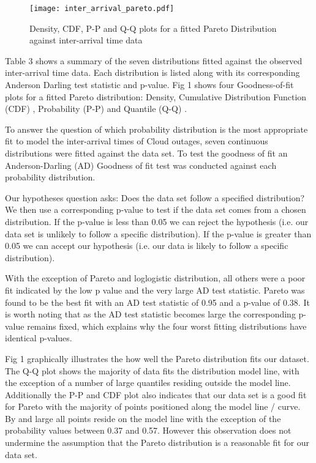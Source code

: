 \documentclass[5p]{elsarticle}
\begin{document}
\begin{figure*}[]
\begin{center}
\texttt{[image: inter\_arrival\_pareto.pdf]} 
\caption{Density, CDF, P-P and Q-Q plots for a fitted Pareto Distribution against inter-arrival time data}
\end{center}
\label{fig:outagedistribution}
\end{figure*}

Table 3 shows a summary of the seven distributions fitted against the observed inter-arrival time data. Each distribution is listed along with its corresponding Anderson Darling test statistic and p-value. Fig 1 shows four Goodness-of-fit plots for a fitted Pareto distribution: Density, Cumulative Distribution Function (CDF) , Probability (P-P) \cite{gibbons2011nonparametric}  and Quantile (Q-Q) \cite{wilk1968probability}.  


To answer the question of which probability distribution is the most appropriate fit to model the inter-arrival times of Cloud outages, seven continuous distributions were fitted against the data set. To test the goodness of fit an Anderson-Darling (AD) Goodness of fit test was conducted against each probability distribution. 

Our hypotheses question asks: Does the data set follow a specified distribution? We then use a corresponding p-value to test if the data set comes from a chosen distribution. If the p-value is less than 0.05 we can reject the hypothesis (i.e. our data set is unlikely to follow a specific distribution). If the p-value is greater than 0.05 we can accept our hypothesis (i.e. our data is likely to follow a specific distribution). 


With the exception of Pareto and loglogistic distribution, all others were a poor fit indicated by the low p value and the very large AD test statistic. Pareto was found to be the best fit with an AD test statistic of 0.95 and a p-value of 0.38. It is worth noting that as the AD test statistic becomes large the corresponding p-value remains fixed, which explains why the four worst fitting distributions have identical p-values.

Fig 1 graphically illustrates the how well the Pareto distribution fits our dataset. The Q-Q plot shows the majority of data fits the distribution model line, with the exception of a number of large quantiles residing outside the model line. Additionally the P-P and CDF plot also indicates that our data set is a good fit for Pareto with the majority of points positioned along the model line / curve. By and large all points reside on the model line with the exception of the probability values between 0.37 and 0.57. However this observation does not undermine the assumption that the Pareto distribution is a reasonable fit for our data set. 
\end{document}
